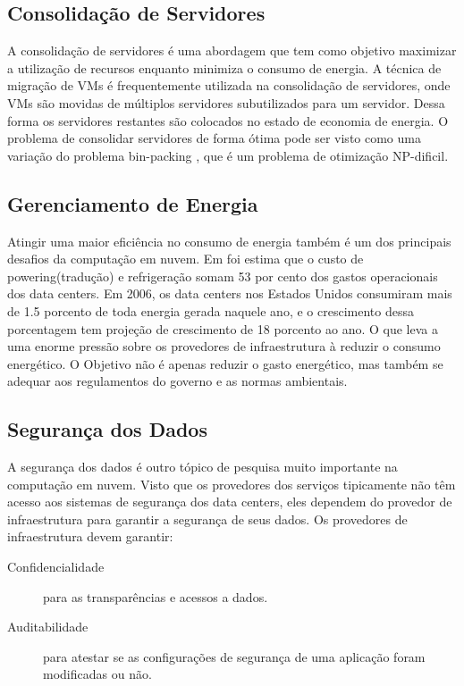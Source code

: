 	\subsection{Consolidação de Servidores}
	A consolidação de servidores é uma abordagem que tem como objetivo maximizar a utilização de recursos enquanto minimiza o consumo de energia. A técnica de migração de VMs é frequentemente utilizada na consolidação de servidores, onde VMs são movidas de múltiplos servidores subutilizados para um servidor. Dessa forma os servidores restantes são colocados no estado de economia de energia. O problema de consolidar servidores de forma ótima pode ser visto como uma variação do problema bin-packing \cite{Chekuri:1999}, que é um problema de otimização NP-dificil.
	
	\subsection{Gerenciamento de Energia}
	Atingir uma maior eficiência no consumo de energia também é um dos principais desafios da computação em nuvem. Em \cite{Hamilton} foi estima que o custo de powering(tradução) e refrigeração somam 53 por cento dos gastos operacionais dos data centers. Em 2006, os data centers nos Estados Unidos consumiram mais de 1.5 porcento de toda energia gerada naquele ano, e o crescimento dessa porcentagem tem projeção de crescimento de 18 porcento ao ano. O que leva a uma enorme pressão sobre os provedores de infraestrutura à reduzir o consumo energético. O Objetivo não é apenas reduzir o gasto energético, mas também se adequar aos regulamentos do governo e as normas ambientais. 
	
	\subsection{Segurança dos Dados}
	A segurança dos dados é outro tópico de pesquisa muito importante na computação em nuvem. Visto que os provedores dos serviços tipicamente não têm acesso aos sistemas de segurança dos data centers, eles dependem do provedor de infraestrutura para garantir a segurança de seus dados. Os provedores de infraestrutura devem garantir:
	\begin{description}
		\item[Confidencialidade] para as transparências e acessos a dados.
		\item[Auditabilidade] para atestar se as configurações de segurança de uma aplicação foram modificadas ou não.  
	\end{description}	 
	

